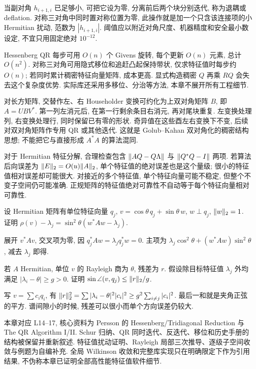 当副对角 $h_{i+1,i}$ 已足够小, 可把它设为零, 分离前后两个块分别迭代, 称为退耦或 deflation. 对称三对角中同时置对称位置为零, 此操作就是加一个只含该连接项的小 Hermitian 扰动, 范数为 $|h_{i+1,i}|$. 阈值应以附近对角尺度、机器精度和安全最小数设定, 不宜只用固定绝对 $10^{-12}$.

Hessenberg QR 每步可用 $O(n)$ 个 Givens 旋转, 每个更新 $O(n)$ 元素, 总计 $O(n^2)$. 对称三对角可用隐式移位和追赶凸起保持带状, 仅求特征值时每步约 $O(n)$; 若同时累计稠密特征向量矩阵, 成本更高. 显式构造稠密 $Q$ 再乘 $RQ$ 会失去这个复杂度优势. 实际库还采用多移位、分治等方法, 本章不展开所有工程细节.

对长方矩阵, 交替作左、右 Householder 变换可约化为上双对角矩阵 $B$, 即 $A=UBV^*$. 第一列左消元后, 在第一行剩余条目右消元, 再对尾块重复. 左变换处理列, 右变换处理行, 同时保留已有零的形状. 奇异值在这些酉左右变换下不变, 后续对双对角矩阵作专用 QR 或其他迭代. 这就是 Golub--Kahan 双对角化的稠密结构思想; 不能把它与直接形成 $A^*A$ 的算法混同.

对于 Hermitian 特征分解, 合理检查包含 $\lVert AQ-Q\Lambda\rVert$ 与 $\lVert Q^*Q-I\rVert$ 两项. 若算法后向误差为 $\lVert E\rVert_2=O(u)\lVert A\rVert_2$, 单个特征值的绝对误差也是这个量级; 很小的特征值相对误差却可能很大. 对接近的多个特征值, 单个特征向量可能不稳定, 但整个不变子空间仍可能准确. 正规矩阵的特征值绝对可靠性不自动等于每个特征向量相对可靠性.

\begin{exercise}
设 Hermitian 矩阵有单位特征向量 $q_j$, $v=\cos\theta\,q_j+\sin\theta\,w$, $w\perp q_j$, $\lVert w\rVert_2=1$. 证明 $\rho(v)-\lambda_j=\sin^2\theta(w^*Aw-\lambda_j)$.
\end{exercise}
\begin{solution}
展开 $v^*Av$, 交叉项为零, 因 $q_j^*Aw=\lambda_jq_j^*w=0$. 主项为 $\lambda_j\cos^2\theta+(w^*Aw)\sin^2\theta$, 减去 $\lambda_j$ 即得.
\end{solution}
\begin{exercise}
若 $A$ Hermitian, 单位 $v$ 的 Rayleigh 商为 $\theta$, 残差为 $r$. 假设除目标特征值 $\lambda_j$ 外均满足 $|\lambda_i-\theta|\ge g>0$. 证明 $\sin\angle(v,q_j)\le\lVert r\rVert_2/g$.
\end{exercise}
\begin{solution}
写 $v=\sum c_iq_i$, 有 $\lVert r\rVert_2^2=\sum|\lambda_i-\theta|^2|c_i|^2\ge g^2\sum_{i\ne j}|c_i|^2$. 最后一和就是夹角正弦的平方. 谱间隙小的时候, 残差可以很小而单个方向误差仍较大.
\end{solution}
\begin{remark}
本章对应 L14--17, 核心资料为 Persson 的 Hessenberg/Tridiagonal Reduction 与 The QR Algorithm I/II. Schur 归纳、QR 同时迭代、反迭代、移位和历史手册的结构被保留并重新叙述. 特征值扰动证明、Rayleigh 局部三次推导、逐级子空间收敛与例题为自编补充. 全局 Wilkinson 收敛和完整库实现只在明确限定下作为引用结果, 不伪称本章已证明全部高性能特征值软件细节.
\end{remark}
